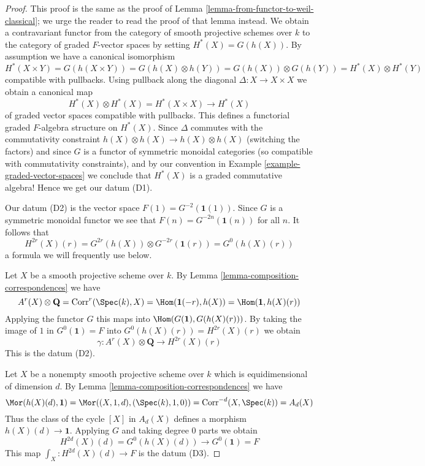 \begin{proof}
This proof is the same as the proof of
Lemma \ref{lemma-from-functor-to-weil-classical};
we urge the reader to read the proof of that lemma instead.
We obtain a contravariant functor from the category of smooth
projective schemes over $k$ to the category of graded $F$-vector spaces
by setting $H^*(X) = G(h(X))$. By assumption we have a canonical
isomorphism
$$
H^*(X \times Y) = G(h(X \times Y)) = G(h(X) \otimes h(Y)) =
G(h(X)) \otimes G(h(Y)) = H^*(X) \otimes H^*(Y)
$$
compatible with pullbacks. Using pullback along the diagonal
$\Delta : X \to X \times X$ we obtain a canonical map
$$
H^*(X) \otimes H^*(X) = H^*(X \times X) \to H^*(X)
$$
of graded vector spaces compatible with pullbacks.
This defines a functorial graded $F$-algebra structure on
$H^*(X)$. Since $\Delta$ commutes with the commutativity
constraint $h(X) \otimes h(X) \to h(X) \otimes h(X)$ (switching the factors)
and since $G$ is a functor of symmetric monoidal categories (so compatible with
commutativity constraints), and by our convention in
Example \ref{example-graded-vector-spaces}
we conclude that $H^*(X)$ is a graded
commutative algebra! Hence we get our datum (D1).

\medskip\noindent
Our datum (D2) is the vector space $F(1) = G^{-2}(\mathbf{1}(1))$.
Since $G$ is a symmetric monoidal functor we see that
$F(n) = G^{-2n}(\mathbf{1}(n))$ for all $n$.
It follows that
$$
H^{2r}(X)(r) = G^{2r}(h(X)) \otimes G^{-2r}(\mathbf{1}(r)) =
G^0(h(X)(r))
$$
a formula we will frequently use below.

\medskip\noindent
Let $X$ be a smooth projective scheme over $k$. By
Lemma \ref{lemma-composition-correspondences} we have
$$
A^r(X) \otimes \mathbf{Q} = \text{Corr}^r(\Spec(k), X) =
\Hom(\mathbf{1}(-r), h(X)) = \Hom(\mathbf{1}, h(X)(r))
$$
Applying the functor $G$ this maps into
$\Hom(G(\mathbf{1}), G(h(X)(r)))$.
By taking the image of $1$ in $G^0(\mathbf{1}) = F$
into $G^0(h(X)(r)) = H^{2r}(X)(r)$ we obtain
$$
\gamma :
A^r(X) \otimes \mathbf{Q} \longrightarrow H^{2r}(X)(r)
$$
This is the datum (D2).

\medskip\noindent
Let $X$ be a nonempty smooth projective scheme over $k$
which is equidimensional of dimension $d$. By
Lemma \ref{lemma-composition-correspondences} we have
$$
\Mor(h(X)(d), \mathbf{1}) = \Mor((X, 1, d), (\Spec(k), 1, 0)) =
\text{Corr}^{-d}(X, \Spec(k)) = A_d(X)
$$
Thus the class of the cycle $[X]$ in $A_d(X)$ defines a morphism
$h(X)(d) \to \mathbf{1}$. Applying $G$ and taking degree $0$
parts we obtain
$$
H^{2d}(X)(d) = G^0(h(X)(d)) \longrightarrow G^0(\mathbf{1}) = F
$$
This map $\int_X : H^{2d}(X)(d) \to F$ is the datum (D3).


\end{proof}
